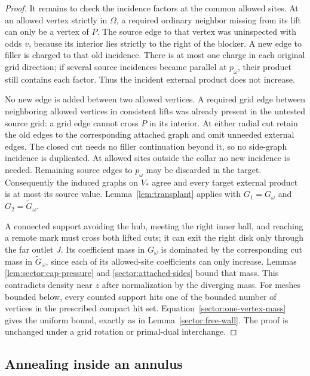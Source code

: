 \begin{proof}
It remains to check the incidence factors at the common allowed
sites.  At an allowed vertex strictly in $\Omega$, a required ordinary
neighbor missing from its lift can only be a vertex of $P$.  The
source edge to that vertex was uninspected with odds $v$, because
its interior lies strictly to the right of the blocker.  A new edge
to filler is charged to that old incidence.  There is at most one
charge in each original grid direction; if several source incidences
became parallel at $p_\omega$, their product still contains each
factor.  Thus the incident external product does not increase.

No new edge is added between two allowed vertices.  A required grid
edge between neighboring allowed vertices in consistent lifts was
already present in the untested source grid: a grid edge cannot cross
$P$ in its interior.  At either radial cut retain the old edges to
the corresponding attached graph and omit unneeded external edges.
The closed cut needs no filler continuation beyond it, so no
side-graph incidence is duplicated.  At allowed sites outside the
collar no new incidence is needed.  Remaining source edges to
$p_\omega$ may be discarded in the target.  Consequently the induced
graphs on $V_*$ agree and every target external product is at most
its source value.  Lemma~\ref{lem:transplant} applies with
$G_1=G_\omega$ and $G_2=\widetilde G_\omega$.

A connected support avoiding the hub, meeting the right inner ball,
and reaching a remote mark must cross both lifted cuts; it can exit
the right disk only through the far outlet $J$.  Its coefficient mass
in $G_\omega$ is dominated by the corresponding cut mass in
$\widetilde G_\omega$, since each of its allowed-site coefficients
can only increase.  Lemmas
\ref{lem:sector:cap-pressure} and \ref{sector:attached-sides} bound
that mass.  This contradicts density near $z$ after normalization by
the diverging mass.  For meshes bounded below, every counted support
hits one of the bounded number of vertices in the prescribed compact
hit set.  Equation~\eqref{sector:one-vertex-mass} gives the uniform
bound, exactly as in Lemma~\ref{sector:free-wall}.
The proof is unchanged under a grid rotation or primal-dual
interchange.
\end{proof}

\subsection{Annealing inside an annulus}
\label{sector:annular-annealing}

